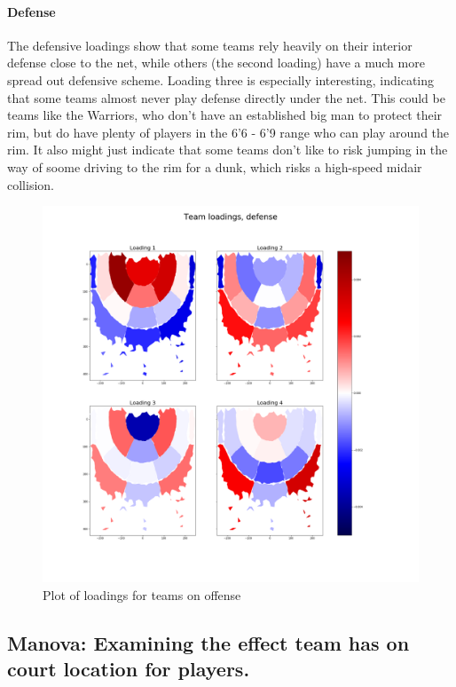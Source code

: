 \documentclass[]{article}
\let\oldparagraph\paragraph
\renewcommand{\paragraph}[1]{\oldparagraph{#1}\mbox{}}
\begin{document}
\hypertarget{defense-1}{%
\paragraph{Defense}\label{defense-1}}

The defensive loadings show that some teams rely heavily on their
interior defense close to the net, while others (the second loading)
have a much more spread out defensive scheme. Loading three is
especially interesting, indicating that some teams almost never play
defense directly under the net. This could be teams like the Warriors,
who don't have an established big man to protect their rim, but do have
plenty of players in the 6'6 - 6'9 range who can play around the rim. It
also might just indicate that some teams don't like to risk jumping in
the way of soome driving to the rim for a dunk, which risks a high-speed
midair collision.

\begin{figure}
\centering
\includegraphics{first_4_loadings_teams_def.png}
\caption{Plot of loadings for teams on offense}
\end{figure}

\hypertarget{manova-examining-the-effect-team-has-on-court-location-for-players.}{%
\subsection{Manova: Examining the effect team has on court location for
players.}\label{manova-examining-the-effect-team-has-on-court-location-for-players.}}
\end{document}

